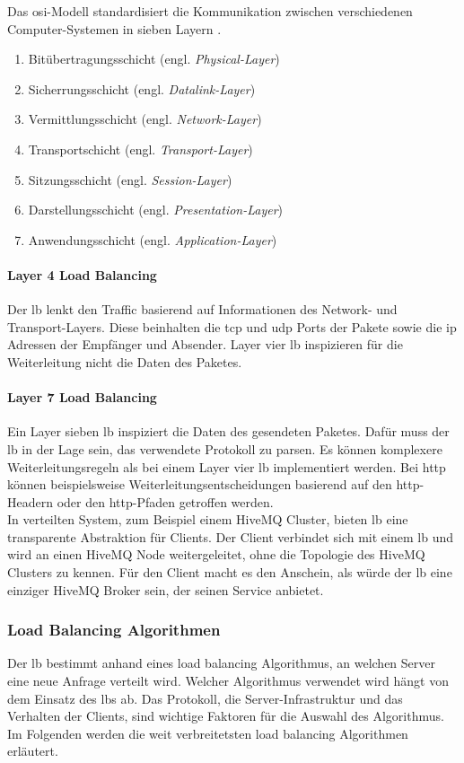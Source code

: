 Das \ac{osi}-Modell standardisiert die Kommunikation zwischen verschiedenen Computer-Systemen in sieben Layern \cite{WhatOSIModel}.
\begin{enumerate}
    \item Bitübertragungsschicht (engl. \textit{Physical-Layer})
    \item Sicherrungsschicht (engl. \textit{Datalink-Layer})
    \item Vermittlungsschicht (engl. \textit{Network-Layer})
    \item Transportschicht (engl. \textit{Transport-Layer})
    \item Sitzungsschicht (engl. \textit{Session-Layer})
    \item Darstellungsschicht (engl. \textit{Presentation-Layer})
    \item Anwendungsschicht (engl. \textit{Application-Layer})
\end{enumerate}
\paragraph{Layer 4 Load Balancing}
Der \ac{lb} lenkt den Traffic basierend auf Informationen des Network- und Transport-Layers. Diese beinhalten die \ac{tcp} und \ac{udp} Ports der Pakete sowie die \ac{ip} Adressen der Empfänger und Absender. Layer vier \acl{lb} inspizieren für die Weiterleitung nicht die Daten des Paketes.
\cite{WhatLoadBalancer}

\paragraph{Layer 7 Load Balancing}
Ein Layer sieben \ac{lb} inspiziert die Daten des gesendeten Paketes. Dafür muss der \ac{lb} in der Lage sein, das verwendete Protokoll zu parsen. Es können komplexere Weiterleitungsregeln als bei einem Layer vier \ac{lb} implementiert werden. Bei \ac{http} können beispielsweise Weiterleitungsentscheidungen basierend auf den \ac{http}-Headern oder den \ac{http}-Pfaden getroffen werden.
\cite{WhatLoadBalancer}
\\
In verteilten System, zum Beispiel einem HiveMQ Cluster, bieten \acl{lb} eine transparente Abstraktion für Clients. Der Client verbindet sich mit einem \ac{lb} und wird an einen HiveMQ Node weitergeleitet, ohne die Topologie des HiveMQ Clusters zu kennen. Für den Client macht es den Anschein, als würde der \ac{lb} eine einziger HiveMQ Broker sein, der seinen Service anbietet.

\subsubsection{Load Balancing Algorithmen} \label{sb:lb-algo}
Der \acl{lb} bestimmt anhand eines load balancing Algorithmus, an welchen Server eine neue Anfrage verteilt wird.
Welcher Algorithmus verwendet wird hängt von dem Einsatz des \aclp{lb} ab.
Das Protokoll, die Server-Infrastruktur und das Verhalten der Clients, sind wichtige Faktoren für die Auswahl des Algorithmus.
\\
Im Folgenden werden die weit verbreitetsten load balancing Algorithmen erläutert.

